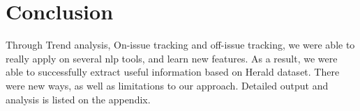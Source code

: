 \section{Conclusion}
Through Trend analysis, On-issue tracking and off-issue tracking, we were able to really apply on several nlp tools, and learn new features. As a result, we were able to successfully extract useful information based on Herald dataset. There were new ways, as well as limitations to our approach. Detailed output and analysis is listed on the appendix.
